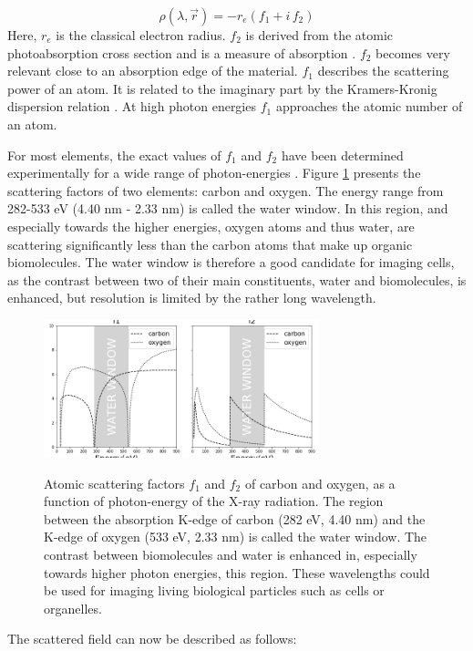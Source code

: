 \begin{equation}
\rho(\lambda,\vec{r}) = -r_e (f_1 + i\,f_2)
\end{equation}
Here, $r_e$ is the classical electron radius. $f_2$ is derived from the atomic photoabsorption cross section and is a measure of absorption \cite{booklet}. $f_2$ becomes very relevant close to an absorption edge of the material. $f_1$ describes the scattering power of an atom. It is related to the imaginary part by the Kramers-Kronig dispersion relation \cite{Kronig1926}. At high photon energies $f_1$ approaches the atomic number of an atom.  

For most elements, the exact values of $f_1$ and $f_2$ have been determined experimentally for a wide range of photon-energies \cite{Henke1993}. Figure \ref{fig:waterwindow} presents the scattering factors of two elements: carbon and oxygen. The energy range from 282-533 eV (4.40 nm - 2.33 nm) is called the water window. In this region, and especially towards the higher energies, oxygen atoms and thus water, are scattering significantly less than the carbon atoms that  make up organic biomolecules. The water window is therefore a good candidate for imaging cells, as the contrast between two of their main constituents, water and biomolecules, is enhanced, but resolution is limited by the rather long wavelength.

\begin{figure}[h]
\centering 
\includegraphics[width=80mm]{Chapter_02_WaterWindow.png}
\label{fig:waterwindow}
\caption{Atomic scattering factors $f_1$ and $f_2$ of carbon and oxygen, as a function of photon-energy of the X-ray radiation. The region between the absorption K-edge of carbon (282 eV, 4.40 nm) and the K-edge of oxygen (533 eV, 2.33 nm) is called the water window.  The contrast between biomolecules and water is enhanced in, especially towards higher photon energies, this region. These wavelengths could be used for imaging living biological particles such as cells or organelles.}
\end{figure}

The scattered field can now be described as follows:

